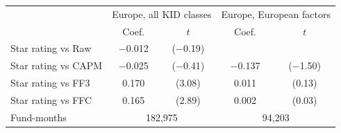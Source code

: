 \begin{tabular}{lcccc}
\toprule
 & \multicolumn{2}{c}{Europe, all KID classes} & \multicolumn{2}{c}{Europe, European factors} \\
 & Coef. & $t$ & Coef. & $t$ \\
\midrule
Star rating vs Raw & $-$0.012 & ($-$0.19) &  &  \\
Star rating vs CAPM & $-$0.025 & ($-$0.41) & $-$0.137 & ($-$1.50) \\
Star rating vs FF3 & 0.170 & (3.08) & 0.011 & (0.13) \\
Star rating vs FFC & 0.165 & (2.89) & 0.002 & (0.03) \\
Fund-months & \multicolumn{2}{c}{182,975} & \multicolumn{2}{c}{94,203} \\
\bottomrule
\end{tabular}
